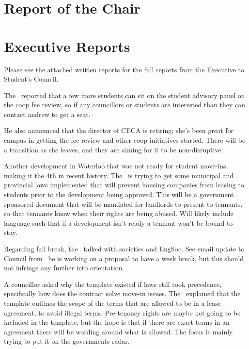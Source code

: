 \section*{Report of the Chair}

\section*{Executive Reports}

Please see the attached written reports for the full reports from the Executive
to Student's Council. 

\begin{information}

    The \vpe\ reported that a few more students can sit on the student advisory
    panel on the coop fee review, so if any councillors or students 
    are interested than they can contact andrew to get a seat.

    He also announced that the director of CECA is retiring; she's been great 
    for campus in getting the fee review and other coop initiatives started. 
    There will be a transition as she leaves, and they are aiming for it to be
    non-disruptive.

    Another development in Waterloo that was not ready for student move-ins,
    making it the 4th in recent history. The \vpe\ is trying to get
    some municipal and provincial laws implemented that will prevent housing
    companies from leasing to students prior to the development being approved. 
    This will be a government sponsored document that will be mandated for 
    landlords to present to tennants, so that tennants know when their rights 
    are being abused. Will likely include language such that if a development 
    isn't ready a tennant won't be bound to stay.

    Regarding fall break, the \vped\ talked with societies and EngSoc. See 
    email update to Council from \andrewc\, he is working on a proposal to 
    have a week break, but this should not infringe any further into 
    orientation. 

    A councillor asked why the template existed if laws still took precedence,  
    specifically how does the contract solve move-in issues. 
    The \vpe\ explained that the template outlines the scope of the terms
    that are allowed to be in a lease agreement, to avoid illegal terms.
    Pre-tenancy rights are maybe not going to be included in the template, but 
    the hope is that if there are exact terms in an agreement there will be
    wording around what is allowed. The focus is mainly trying to put it on the
    governments radar. 


\end{information}
